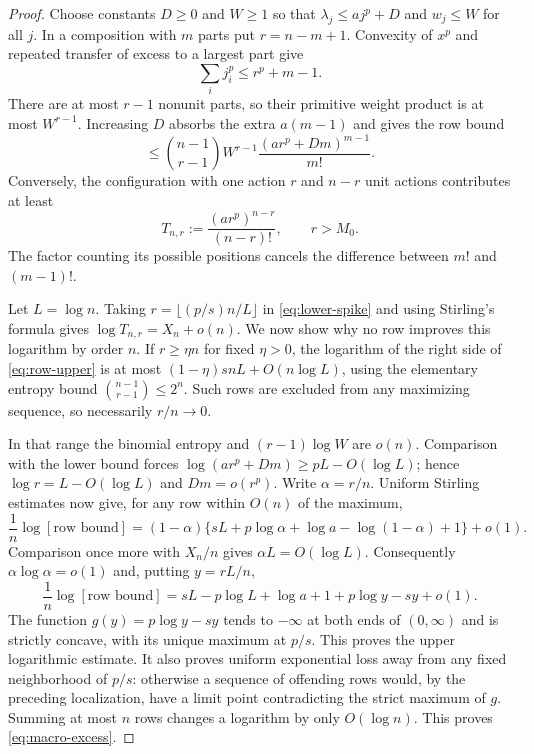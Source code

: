 \documentclass[11pt,a4paper]{article}
\numberwithin{equation}{section}
\theoremstyle{definition}
\theoremstyle{remark}
\begin{document}
\begin{proof}
Choose constants $D\ge0$ and $W\ge1$ so that
$\lambda_j\le a j^p+D$ and $w_j\le W$ for all $j$. In a composition
with $m$ parts put $r=n-m+1$. Convexity of $x^p$ and repeated transfer
of excess to a largest part give
\[
 \sum_i j_i^p\le r^p+m-1.
\]
There are at most $r-1$ nonunit parts, so their primitive weight product
is at most $W^{r-1}$. Increasing $D$ absorbs the extra $a(m-1)$ and gives
the row bound
\begin{equation}
 [\text{$m$-part contribution}]
 \le\binom{n-1}{r-1}W^{r-1}
       \frac{(a r^p+Dm)^{m-1}}{m!}.
 \label{eq:row-upper}
\end{equation}
Conversely, the configuration with one action $r$ and $n-r$ unit actions
contributes at least
\begin{equation}
 T_{n,r}:=\frac{(a r^p)^{n-r}}{(n-r)!},
 \qquad r>M_0.
 \label{eq:lower-spike}
\end{equation}
The factor counting its possible positions cancels the difference between
$m!$ and $(m-1)!$.

Let $L=\log n$. Taking $r=\lfloor(p/s)n/L\rfloor$ in
\eqref{eq:lower-spike} and using Stirling's formula gives
$\log T_{n,r}=X_n+o(n)$.
We now show why no row improves this logarithm by order $n$.
If $r\ge\eta n$ for fixed $\eta>0$, the logarithm of the right side of
\eqref{eq:row-upper} is at most
$(1-\eta)s nL+O(n\log L)$, using the elementary entropy bound
$\binom{n-1}{r-1}\le2^n$. Such rows are excluded from any maximizing
sequence, so necessarily $r/n\to0$.

In that range the binomial entropy and $(r-1)\log W$ are $o(n)$.
Comparison with the lower bound forces
$\log(a r^p+Dm)\ge pL-O(\log L)$; hence
$\log r=L-O(\log L)$ and $Dm=o(r^p)$. Write $\alpha=r/n$.
Uniform Stirling estimates now give, for any row within $O(n)$ of the
maximum,
\[
 \frac1n\log[\text{row bound}]
 =(1-\alpha)\{sL+p\log\alpha+\log a
                -\log(1-\alpha)+1\}+o(1).
\]
Comparison once more with $X_n/n$ gives $\alpha L=O(\log L)$.
Consequently $\alpha\log\alpha=o(1)$ and, putting $y=rL/n$,
\begin{equation}
 \frac1n\log[\text{row bound}]
 =sL-p\log L+\log a+1+p\log y-sy+o(1).
 \label{eq:variational}
\end{equation}
The function $g(y)=p\log y-sy$ tends to $-\infty$ at both ends of
$(0,\infty)$ and is strictly concave, with its unique maximum at $p/s$.
This proves the upper logarithmic estimate. It also proves uniform
exponential loss away from any fixed neighborhood of $p/s$: otherwise a
sequence of offending rows would, by the preceding localization, have a
limit point contradicting the strict maximum of $g$. Summing at most $n$
rows changes a logarithm by only $O(\log n)$. This proves
\eqref{eq:macro-excess}.


\end{proof}
\end{document}
